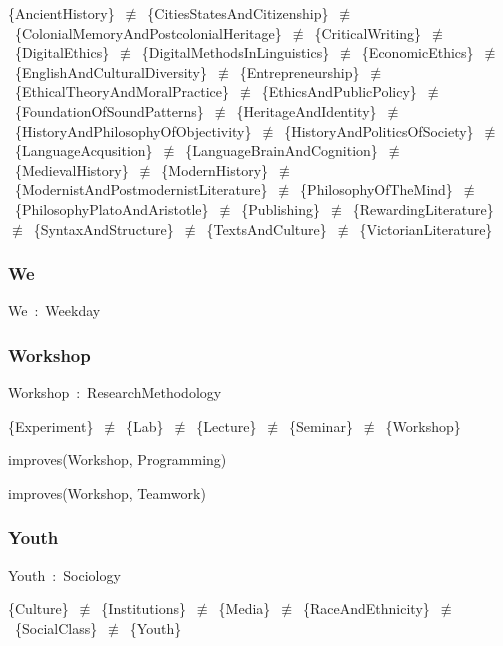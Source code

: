 \documentclass{article}
\begin{document}
\{AncientHistory\}~\ensuremath{\not\equiv}~\{CitiesStatesAndCitizenship\}~\ensuremath{\not\equiv}~\{ColonialMemoryAndPostcolonialHeritage\}~\ensuremath{\not\equiv}~\{CriticalWriting\}~\ensuremath{\not\equiv}~\{DigitalEthics\}~\ensuremath{\not\equiv}~\{DigitalMethodsInLinguistics\}~\ensuremath{\not\equiv}~\{EconomicEthics\}~\ensuremath{\not\equiv}~\{EnglishAndCulturalDiversity\}~\ensuremath{\not\equiv}~\{Entrepreneurship\}~\ensuremath{\not\equiv}~\{EthicalTheoryAndMoralPractice\}~\ensuremath{\not\equiv}~\{EthicsAndPublicPolicy\}~\ensuremath{\not\equiv}~\{FoundationOfSoundPatterns\}~\ensuremath{\not\equiv}~\{HeritageAndIdentity\}~\ensuremath{\not\equiv}~\{HistoryAndPhilosophyOfObjectivity\}~\ensuremath{\not\equiv}~\{HistoryAndPoliticsOfSociety\}~\ensuremath{\not\equiv}~\{LanguageAcqusition\}~\ensuremath{\not\equiv}~\{LanguageBrainAndCognition\}~\ensuremath{\not\equiv}~\{MedievalHistory\}~\ensuremath{\not\equiv}~\{ModernHistory\}~\ensuremath{\not\equiv}~\{ModernistAndPostmodernistLiterature\}~\ensuremath{\not\equiv}~\{PhilosophyOfTheMind\}~\ensuremath{\not\equiv}~\{PhilosophyPlatoAndAristotle\}~\ensuremath{\not\equiv}~\{Publishing\}~\ensuremath{\not\equiv}~\{RewardingLiterature\}~\ensuremath{\not\equiv}~\{SyntaxAndStructure\}~\ensuremath{\not\equiv}~\{TextsAndCulture\}~\ensuremath{\not\equiv}~\{VictorianLiterature\}

\subsubsection*{We}

We~:~Weekday

\subsubsection*{Workshop}

Workshop~:~ResearchMethodology

\{Experiment\}~\ensuremath{\not\equiv}~\{Lab\}~\ensuremath{\not\equiv}~\{Lecture\}~\ensuremath{\not\equiv}~\{Seminar\}~\ensuremath{\not\equiv}~\{Workshop\}

improves(Workshop, Programming)

improves(Workshop, Teamwork)

\subsubsection*{Youth}

Youth~:~Sociology

\{Culture\}~\ensuremath{\not\equiv}~\{Institutions\}~\ensuremath{\not\equiv}~\{Media\}~\ensuremath{\not\equiv}~\{RaceAndEthnicity\}~\ensuremath{\not\equiv}~\{SocialClass\}~\ensuremath{\not\equiv}~\{Youth\}
\end{document}
